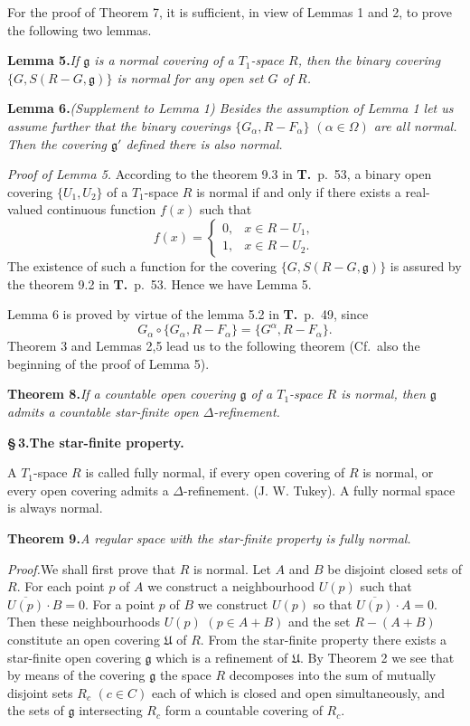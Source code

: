 \documentclass[11pt,a4paper,leqno]{article}
\newcommand{\g}{\mathfrak g}
\newcommand{\thm}[2]{\par\medskip\textbf{Theorem #1.}\quad\textit{#2}\par}
\newcommand{\lem}[2]{\par\medskip\textbf{Lemma #1.}\quad\textit{#2}\par}
\newcommand{\proof}{\textit{Proof.}\quad}
\newcommand{\sect}[2]{\par\medskip\begin{center}\bfseries\S\,#1.\quad #2\end{center}}
\begin{document}
For the proof of Theorem 7, it is sufficient, in view of Lemmas 1 and 2, to prove the following two lemmas.

\lem{5}{If $\g$ is a normal covering of a $T_1$-space $R$, then the binary covering $\{G,S(R-G,\g)\}$ is normal for any open set $G$ of $R$.}

\lem{6}{(Supplement to Lemma 1) Besides the assumption of Lemma 1 let us assume further that the binary coverings $\{G_\alpha,R-F_\alpha\}$ $(\alpha\in\Omega)$ are all normal. Then the covering $\g'$ defined there is also normal.}

\textit{Proof of Lemma 5.} According to the theorem 9.3 in \textbf{T.}\ p.\ 53, a binary open covering $\{U_1,U_2\}$ of a $T_1$-space $R$ is normal if and only if there exists a real-valued continuous function $f(x)$ such that
\[
f(x)=\begin{cases}0,&x\in R-U_1,\\1,&x\in R-U_2.\end{cases}
\]
The existence of such a function for the covering $\{G,S(R-G,\g)\}$ is assured by the theorem 9.2 in \textbf{T.}\ p.\ 53. Hence we have Lemma 5.

Lemma 6 is proved by virtue of the lemma 5.2 in \textbf{T.}\ p.\ 49, since
\[
G_\alpha\circ\{G_\alpha,R-F_\alpha\}=\{G^{\alpha},R-F_\alpha\}.
\]
Theorem 3 and Lemmas 2,5 lead us to the following theorem (Cf.\ also the beginning of the proof of Lemma 5).

\thm{8}{If a countable open covering $\g$ of a $T_1$-space $R$ is normal, then $\g$ admits a countable star-finite open $\Delta$-refinement.}
\newpage
\sect{3}{The star-finite property.}
A $T_1$-space $R$ is called fully normal, if every open covering of $R$ is normal, or every open covering admits a $\Delta$-refinement. (J. W. Tukey). A fully normal space is always normal.

\thm{9}{A regular space with the star-finite property is fully normal.}

\proof We shall first prove that $R$ is normal. Let $A$ and $B$ be disjoint closed sets of $R$. For each point $p$ of $A$ we construct a neighbourhood $U(p)$ such that $\overline{U(p)}\cdot B=0$. For a point $p$ of $B$ we construct $U(p)$ so that $\overline{U(p)}\cdot A=0$. Then these neighbourhoods $U(p)$ $(p\in A+B)$ and the set $R-(A+B)$ constitute an open covering $\mathfrak U$ of $R$. From the star-finite property there exists a star-finite open covering $\g$ which is a refinement of $\mathfrak U$. By Theorem 2 we see that by means of the covering $\g$ the space $R$ decomposes into the sum of mutually disjoint sets $R_c$ $(c\in C)$ each of which is closed and open simultaneously, and the sets of $\g$ intersecting $R_c$ form a countable covering of $R_c$.
\end{document}
